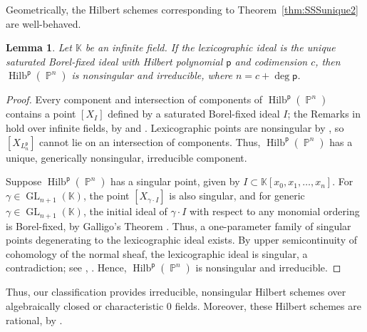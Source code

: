 \documentclass[12pt]{amsart}%
\newtheorem{lemma}[theorem]{Lemma}
\theoremstyle{definition}%
\DeclareMathOperator{\hilb}{Hilb}%
\DeclareMathOperator{\PP}{\mathbb{P}}%
\newcommand{\hp}{\mathsf{p}}%
\newcommand{\kk}{\mathbb{K}}%
\begin{document}
Geometrically, the Hilbert schemes corresponding to
Theorem~\ref{thm:SSSunique2} are well-behaved.

\begin{lemma}
  \label{lem:Hilbertirred}
  Let $\kk$ be an infinite field.  If the lexicographic ideal is the
  unique saturated Borel-fixed ideal with Hilbert polynomial $\hp$ and
  codimension $c$, then $\hilb^{\hp}(\PP^n)$ is nonsingular and
  irreducible, where $n = c + \deg \hp$.
\end{lemma}

\begin{proof}
  Every component and intersection of components of
  $\hilb^{\hp}(\PP^n)$ contains a point $\left[ X_I \right]$ defined
  by a saturated Borel-fixed ideal $I$; the Remarks in
  \cite[\S~2]{Reeves--1995} hold over infinite fields, by
  \cite[Proposition~1]{Bayer--Stillman--1987b} and
  \cite[Theorem~15.17]{Eisenbud--1995}.  Lexicographic points are
  nonsingular by \cite[Theorem~1.4]{Reeves--Stillman--1997}, so
  $\left[ X_{L^{\hp}_n} \right]$ cannot lie on an intersection of
  components.  Thus, $\hilb^{\hp}(\PP^n)$ has a unique, generically
  nonsingular, irreducible component.

  Suppose $\hilb^{\hp}(\PP^n)$ has a singular point, given by $I
  \subset \kk[x_0, x_1, \dotsc, x_{n}]$.  For $\gamma \in
  \operatorname{GL}_{n+1}(\kk)$, the point $\left[ X_{\gamma \cdot I}
    \right]$ is also singular, and for generic $\gamma \in
  \operatorname{GL}_{n+1}(\kk)$, the initial ideal of $\gamma \cdot I$
  with respect to any monomial ordering is Borel-fixed, by Galligo's
  Theorem \cite{Galligo--1974, Bayer--Stillman--1987b}.  Thus, a
  one-parameter family of singular points degenerating to the
  lexicographic ideal exists.  By upper semicontinuity of cohomology
  of the normal sheaf, the lexicographic ideal is singular, a
  contradiction; see \cite[III, Theorem~12.8]{Hartshorne--1977},
  \cite[Theorem~1.1(b)]{Hartshorne--2010}.  Hence,
  $\hilb^{\hp}(\PP^n)$ is nonsingular and irreducible.
\end{proof}

Thus, our classification provides irreducible, nonsingular Hilbert
schemes over algebraically closed or characteristic $0$ fields.
Moreover, these Hilbert schemes are rational, by \cite[Theorem
  C]{Lella--Roggero--2011}.
\end{document}
